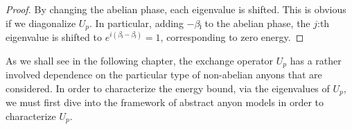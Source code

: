 \begin{proof}
  By changing the abelian phase, each eigenvalue is shifted. This is obvious if we diagonalize $U_p$. In particular, adding $-βⱼ$ to the abelian phase, the $j$:th eigenvalue is shifted to $e^{i(βⱼ-βⱼ)} = 1$, corresponding to zero energy.
\end{proof}



As we shall see in the following chapter, the exchange operator $U_p$ has a rather involved dependence on the particular type of non-abelian anyons that are considered. In order to characterize the energy bound, via the eigenvalues of $U_p$, we must first dive into the framework of abstract anyon models in order to characterize $U_p$.
